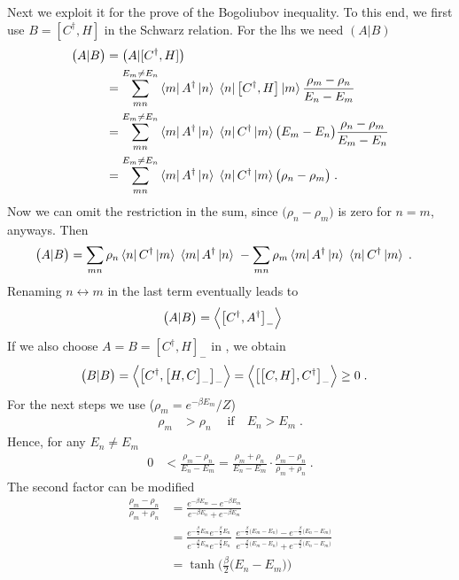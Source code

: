 Next we exploit it for the prove of the Bogoliubov inequality. To this end, we first use
$B=[C^{\dagger},H]$ in the Schwarz relation. For the lhs we need $(A|B)$
%
\begin{align*}
\big( A|B \big) &=\big( A|[C^{\dagger},H]\big)\\
&=\sum^{E_{m}\ne E_{n}}_{mn}
\bra{m} A^{\dagger}\ket{n}\;\bra{n}\big[ C^{\dagger},H \big]\ket{m}
\frac{\rho_{m}-\rho_{n}}{E_{n}-E_{m}}\\
&=\sum^{E_{m}\ne E_{n}}_{mn}
\bra{m} A^{\dagger}\ket{n}\;\bra{n}C^{\dagger}\ket{m}\big( E_{m}-E_{n} \big)
\frac{\rho_{n}-\rho_{m}}{E_{m}-E_{n}}\\
&=\sum^{E_{m}\ne E_{n}}_{mn}
\bra{m} A^{\dagger}\ket{n}\;\bra{n}C^{\dagger}\ket{m}
\big(\rho_{n}-\rho_{m}\big)\;.
\end{align*}
%
Now we can omit the restriction in the sum, since $\big(\rho_{n}-\rho_{m}\big)$ 
is zero for $n=m$, anyways. Then
\begin{align*}
\big( A|B \big) &=\sum_{mn}
\rho_{n} \bra{n}C^{\dagger}\ket{m} \;\bra{m} A^{\dagger}\ket{n}\;
-
\sum_{mn}\rho_{m}
\bra{m} A^{\dagger}\ket{n}\;\bra{n}C^{\dagger}\ket{m}
\;.
\end{align*}
%
Renaming $n\leftrightarrow m$ in the last term 
eventually leads to
\begin{align}\label{eq:schwarz:2}
\big( A|B \big) &=\left\langle \big[C^{\dagger}, A^{\dagger}\big]_{-}\right\rangle\;
\end{align}
If we also choose  $A=B=[C^{\dagger},H]_{-}$ in , we obtain
%
\begin{align}\label{eq:schwarz:3}
\big( B|B  \big) &= 
\left\langle \big[C^{\dagger}, \big[ H,C \big]_{-}\big]_{-}\right\rangle
=\left\langle \big[\big[ C,H \big],C^{\dagger}\big]_{-}\right\rangle\ge 0\;.
\end{align}
%
For the next steps we use ($\rho_{m}= e^{-\beta E_{m}}/Z$)
%
\begin{align*}
\rho_{m} &> \rho_{n} \;\quad \text{if}\quad E_{n} > E_{m}\;.
\end{align*}
%
Hence, for any $E_{n}\ne E_{m}$
%
\begin{align}\label{eq:bogoliubov1}
0 &< \frac{\rho_{m}-\rho_{n}}{E_{n}-E_{m}} = \frac{\rho_{m}+\rho_{n}}{E_{n}-E_{m}}\cdot 
\frac{\rho_{m}-\rho_{n}}{\rho_{m}+\rho_{n}}\;.
\end{align}
%
The second factor can be modified 
%
\begin{align*}
\frac{\rho_{m} - \rho_{n}}{\rho_{m}+\rho_{n}} &= 
\frac{e^{-\beta E_{m}}-e^{-\beta E_{m}}}{e^{-\beta E_{n}}+e^{-\beta E_{m}}}\\
&=\frac{e^{-\frac{\beta}{2} E_{m}}e^{-\frac{\beta}{2} E_{n}}}{e^{-\frac{\beta}{2} E_{m}}e^{-\frac{\beta}{2} E_{n}}}\;
\frac{
e^{-\frac{\beta}{2} \big(E_{m}-E_{n}\big)}-e^{-\frac{\beta}{2} \big(E_{n}-E_{m}\big)}
}{
e^{-\frac{\beta}{2} \big(E_{m}-E_{n}\big)}+e^{-\frac{\beta}{2} \big(E_{n}-E_{m}\big)}
}\\
&=\tanh\bigg( \frac{\beta}{2}\big(E_{n}-E_{m}\big) \bigg)
\end{align*}
